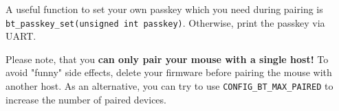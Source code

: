 \documentclass[11pt]{article}
\begin{document}
A useful function to set your own passkey which you need during pairing is\\\texttt{bt\_passkey\_set(unsigned int passkey)}. Otherwise, print the passkey via UART.

Please note, that you \textbf{can only pair your mouse with a single host!} To avoid "funny" side effects, delete your firmware before pairing the mouse with another host. As an alternative, you can try to use \texttt{CONFIG\_BT\_MAX\_PAIRED} to increase the number of paired devices.
\end{document}
